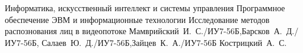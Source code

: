 \documentclass{bmstu}
\begin{document}
	
	\makeresearchtitle
    {Информатика, искусственный интеллект и системы управления} %
    {Программное обеспечение ЭВМ и информационные технологии} %
    {Исследование методов распознования лиц в видеопотоке} %
    {Мамврийский~И.~С./ИУ7-56Б,Барсков~А.~Д./ИУ7-56Б, Салаев~Ю.~Д./ИУ7-56Б,Зайцев~К.~А./ИУ7-56Б} %
    {Кострицкий~А.~С.} %
    {} %
	
	\setcounter{page}{3}
    \maketableofcontents
	
	
	
	
	
	
	

    \makebibliography
\end{document}
